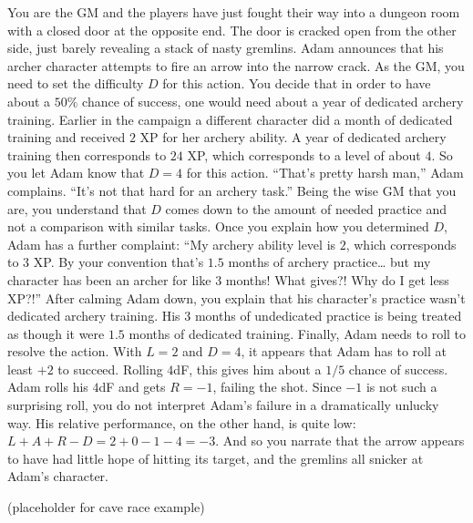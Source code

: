 \begin{example}
You are the GM and the players have just fought their way into a dungeon room with a closed door at the opposite end.
The door is cracked open from the other side, just barely revealing a stack of nasty gremlins.
Adam announces that his archer character attempts to fire an arrow into the narrow crack.
As the GM, you need to set the difficulty $D$ for this action.
You decide that in order to have about a $50\%$ chance of success, one would need about a year of dedicated archery training.
Earlier in the campaign a different character did a month of dedicated training and received $2$ XP for her archery ability.
A year of dedicated archery training then corresponds to $24$ XP, which corresponds to a level of about $4$.
So you let Adam know that $D=4$ for this action.
``That’s pretty harsh man,'' Adam complains.
``It’s not that hard for an archery task.''
Being the wise GM that you are, you understand that $D$ comes down to the amount of needed practice and not a comparison with similar tasks.
Once you explain how you determined $D$, Adam has a further complaint:
``My archery ability level is $2$, which corresponds to $3$ XP.
By your convention that’s $1.5$ months of archery practice… but my character has been an archer for like $3$ months!
What gives?!
Why do I get less XP?!'' After calming Adam down, you explain that his character’s practice wasn’t dedicated archery training.
His $3$ months of undedicated practice is being treated as though it were $1.5$ months of dedicated training.
Finally, Adam needs to roll to resolve the action.
With $L=2$ and $D=4$, it appears that Adam has to roll at least $+2$ to succeed.
Rolling $4$dF, this gives him about a $1/5$ chance of success.
Adam rolls his $4$dF and gets $R=-1$, failing the shot.
Since $-1$ is not such a surprising roll, you do not interpret Adam’s failure in a dramatically unlucky way.
His relative performance, on the other hand, is quite low: $L+A+R-D = 2+0-1-4 = -3$.
And so you narrate that the arrow appears to have had little hope of hitting its target,
and the gremlins all snicker at Adam’s character.
\end{example}


\begin{example}
(placeholder for cave race example)
\end{example}


